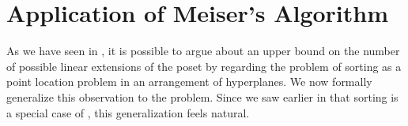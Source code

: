 \chapter{Application of Meiser's Algorithm}

As we have seen in , it is possible to argue about an
upper bound on the number of possible linear extensions of the poset \XY by
regarding the problem of sorting \XY as a point location problem in an
arrangement of hyperplanes. We now formally generalize this observation
to the \kSUM problem. Since we saw earlier in  that
sorting \XY is a special case of \fourLDT, this generalization feels natural.
